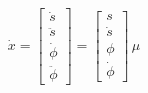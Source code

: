\begin{equation}\label{fullss}
    \dot{x} = \begin{bmatrix}\dot{s} \\ \ddot{s} \\ \dot{\phi} \\ \ddot{\phi}\end{bmatrix} =  \begin{bmatrix} s \\ \dot{s} \\ \phi \\ \dot{\phi}\end{bmatrix} \,\mu
\end{equation}